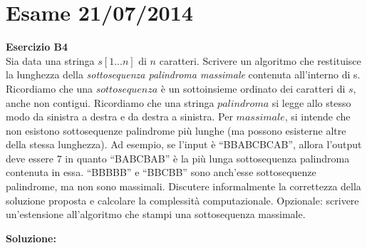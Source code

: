\documentclass[../cheatSheetAlgoritmi.tex]{subfiles}
\begin{document}
\section{Esame 21/07/2014}
\textbf{Esercizio B4}\\
Sia data una stringa $s[1...n]$ di $n$ caratteri. Scrivere un algoritmo che restituisce la lunghezza della \emph{sottosequenza palindroma massimale} contenuta all'interno di s. Ricordiamo che una $sottosequenza$ è un sottoinsieme ordinato dei caratteri di $s$, anche non contigui. Ricordiamo che una stringa $palindroma$ si legge allo stesso modo da sinistra a destra e da destra a sinistra. Per $massimale$, si intende che non esistono sottosequenze palindrome più lunghe (ma possono esisterne altre della stessa lunghezza). Ad esempio, se l'input è “BBABCBCAB”, allora l'output deve essere 7 in quanto “BABCBAB” è la più lunga sottosequenza palindroma contenuta in essa. “BBBBB” e “BBCBB” sono anch'esse sottosequenze palindrome, ma non sono massimali. Discutere informalmente la correttezza della soluzione proposta e calcolare la complessità computazionale. Opzionale: scrivere un'estensione all'algoritmo che stampi una sottosequenza massimale.

\textbf{Soluzione:}
\end{document}
